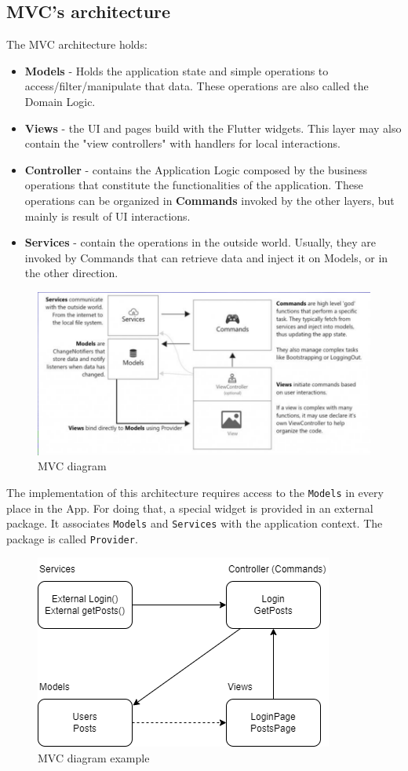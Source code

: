\subsection{MVC's architecture}
The MVC architecture holds:
\begin{itemize}
    \item \textbf{Models} - Holds the application state and simple operations to access/filter/manipulate
    that data. These operations are also called the Domain Logic.
    \item \textbf{Views} - the UI and pages build with the Flutter widgets. This layer may also contain the
    "view controllers" with handlers for local interactions.
    \item \textbf{Controller} - contains the Application Logic composed by the business operations that
    constitute the functionalities of the application. These operations can be organized in \textbf{Commands}
    invoked by the other layers, but mainly is result of UI interactions.
    \item \textbf{Services} - contain the operations in the outside world. Usually, they are invoked by
    Commands that can retrieve data and inject it on Models, or in the other direction.
\end{itemize}

\begin{figure}[h]
\centering
\includegraphics[width=0.8\linewidth]{figures/11_MVC_diagram.png}
\caption{MVC diagram}
\label{fig:mvc_diagram}
\end{figure}
\newpage
The implementation of this architecture requires access to the \texttt{Models} in every place in
the App. For doing that, a special widget is provided in an external package. It associates
\texttt{Models} and \texttt{Services} with the application context. The package is called \texttt{Provider}. 


\begin{figure}[h]
\centering
\includegraphics[width=0.6\linewidth]{figures/11_mvc_example_diagram.png}
\caption{MVC diagram example}
\label{fig:mvc_diagram_example}
\end{figure}

